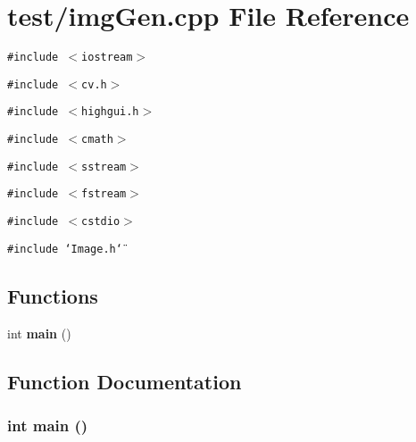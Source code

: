 \section{test/imgGen.cpp File Reference}
\label{imgGen_8cpp}
{\tt \#include $<$iostream$>$}\par
{\tt \#include $<$cv.h$>$}\par
{\tt \#include $<$highgui.h$>$}\par
{\tt \#include $<$cmath$>$}\par
{\tt \#include $<$sstream$>$}\par
{\tt \#include $<$fstream$>$}\par
{\tt \#include $<$cstdio$>$}\par
{\tt \#include \char`\"{}Image.h\char`\"{}}\par
\subsection*{Functions}
\begin{CompactItemize}
\item 
int {\bf main} ()
\end{CompactItemize}


\subsection{Function Documentation}
\subsubsection{\setlength{\rightskip}{0pt plus 5cm}int main ()}\label{imgGen_8cpp_446c6b9a1a4dbab517fbb760870458a3}


